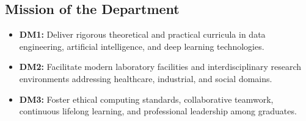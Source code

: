 \subsection*{Mission of the Department}
\begin{itemize}
    \item \textbf{DM1:} Deliver rigorous theoretical and practical curricula in data engineering, artificial intelligence, and deep learning technologies.
    \item \textbf{DM2:} Facilitate modern laboratory facilities and interdisciplinary research environments addressing healthcare, industrial, and social domains.
    \item \textbf{DM3:} Foster ethical computing standards, collaborative teamwork, continuous lifelong learning, and professional leadership among graduates.
\end{itemize}
